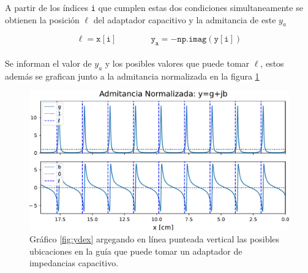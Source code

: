 \documentclass[11pt,a4paper]{article}
\begin{document}
\begin{appendices}
\begin{multicols}{2}
    A partir de los índices \texttt{i} que cumplen estas dos condiciones simultaneamente se obtienen la posición $\ell$ del adaptador capacitivo y la admitancia de este $y_a$ 
    
    \begin{equation}
        \mathtt{\ell = x[i]\qquad\qquad y_a = - np.imag(y[i])}
    \end{equation}\\[-1em]

    Se informan el valor de $y_a$ y los posibles valores que puede tomar $\ell$, estos además se grafican junto a la admitancia normalizada en la figura \ref{fig:ydex_l}\\

    \begin{figure}[H]
        \centering
        \includegraphics[width=\linewidth]{Images/ydex_l.pdf}
        \caption{Gráfico \ref{fig:ydex} argegando en línea punteada vertical las posibles ubicaciones en la guía que puede tomar un adaptador de impedancias capacitivo.}
        \label{fig:ydex_l}
    \end{figure}

\end{multicols}
\pagebreak

\end{appendices}
\end{document}
